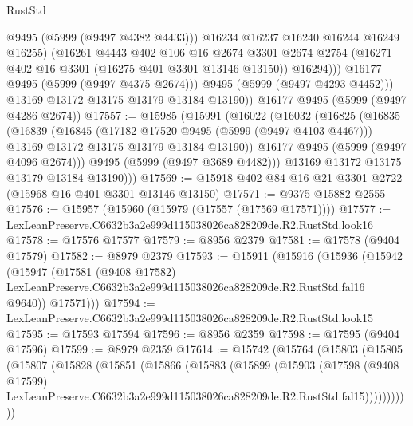 \begin{lexlean}{RustStd}
\begin{coremodule}
                    @9495
                    (@5999 (@9497 @4382 @4433)))
                  @16234
                  @16237
                  @16240
                  @16244
                  @16249
                  @16255)
                (@16261
                  @4443
                  @402
                  @106
                  @16
                  @2674
                  @3301
                  @2674
                  @2754
                  (@16271 @402 @16 @3301 (@16275 @401 @3301 @13146 @13150))
                  @16294)))
            @16177
            @9495
            (@5999 (@9497 @4375 @2674)))
          @9495
          (@5999 (@9497 @4293 @4452)))
        @13169
        @13172
        @13175
        @13179
        @13184
        @13190))
    @16177
    @9495
    (@5999 (@9497 @4286 @2674))
@17557 := @15985
    (@15991
      (@16022
        (@16032
          (@16825
            (@16835
              (@16839
                (@16845
                  (@17182 @17520 @9495 (@5999 (@9497 @4103 @4467)))
                  @13169
                  @13172
                  @13175
                  @13179
                  @13184
                  @13190))
              @16177
              @9495
              (@5999 (@9497 @4096 @2674)))
            @9495
            (@5999 (@9497 @3689 @4482)))
          @13169
          @13172
          @13175
          @13179
          @13184
          @13190)))
@17569 := @15918 @402 @84 @16 @21 @3301 @2722 (@15968 @16 @401 @3301 @13146 @13150)
@17571 := @9375 @15882 @2555
@17576 := @15957 (@15960 (@15979 (@17557 (@17569 @17571))))
@17577 := LexLeanPreserve.C6632b3a2e999d115038026ca828209de.R2.RustStd.look16
@17578 := @17576 @17577
@17579 := @8956 @2379
@17581 := @17578 (@9404 @17579)
@17582 := @8979 @2379
@17593 := @15911
    (@15916
      (@15936
        (@15942
          (@15947
            (@17581
              (@9408 @17582)
              LexLeanPreserve.C6632b3a2e999d115038026ca828209de.R2.RustStd.fal16
              @9640))
          @17571)))
@17594 := LexLeanPreserve.C6632b3a2e999d115038026ca828209de.R2.RustStd.look15
@17595 := @17593 @17594
@17596 := @8956 @2359
@17598 := @17595 (@9404 @17596)
@17599 := @8979 @2359
@17614 := @15742
    (@15764
      (@15803
        (@15805
          (@15807
            (@15828
              (@15851
                (@15866
                  (@15883
                    (@15899
                      (@15903
                        (@17598
                          (@9408 @17599)
                          LexLeanPreserve.C6632b3a2e999d115038026ca828209de.R2.RustStd.fal15)))))))))))

\end{coremodule}
\end{lexlean}
